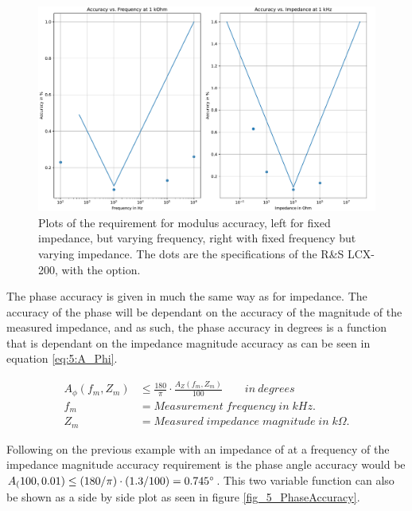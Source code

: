 \begin{figure}[H]
  \centering
  \includegraphics[width=1\textwidth]{Sections/5_SystemRequirements/Figures/ImpedanceSpec.pdf}
  \caption{Plots of the requirement for modulus accuracy, left for fixed impedance, but varying frequency, right with fixed frequency but varying impedance. The dots are the specifications of the R\&S LCX-200, with the  option.}
  \label{fig_5_ModulusAccuracy}
\end{figure}

The phase accuracy is given in much the same way as for impedance. The accuracy of the phase will be dependant on the accuracy of the magnitude of the measured impedance, and as such, the phase accuracy in degrees is a function that is dependant on the impedance magnitude accuracy as can be seen in equation \ref{eq:5:A_Phi}.

\begin{equation}
  \begin{split}
    \label{eq:5:A_Phi}
    A_\phi(f_m, Z_m) & \leq \frac{180}{\pi} \cdot \frac{A_Z(f_m,Z_m)}{100} \qquad in \:degrees\\
    f_m & = Measurement \; frequency \; in \; kHz. \\
    Z_m &= Measured \; impedance \; magnitude \; in \; k\Omega.
  \end{split}
\end{equation}

Following on the previous example with an impedance of  at a frequency of  the impedance magnitude accuracy requirement is  the phase
angle accuracy would be $A_(100,0.01) \leq (180/\pi)\cdot(1.3/100) = \SI{0.745}{\degree}$. This two variable function can also be shown as a side by side plot as seen in figure \ref{fig_5_PhaseAccuracy}.


